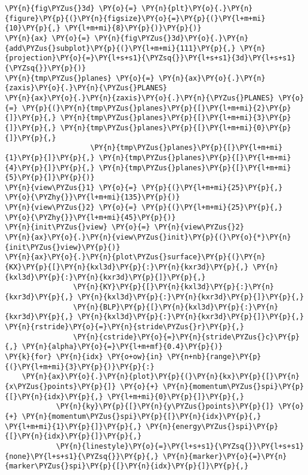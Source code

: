 \begin{Verbatim}[commandchars=\\\{\}]
\PY{n}{fig\PYZus{}3d} \PY{o}{=} \PY{n}{plt}\PY{o}{.}\PY{n}{figure}\PY{p}{(}\PY{n}{figsize}\PY{o}{=}\PY{p}{(}\PY{l+m+mi}{10}\PY{p}{,} \PY{l+m+mi}{8}\PY{p}{)}\PY{p}{)}
\PY{n}{ax} \PY{o}{=} \PY{n}{fig\PYZus{}3d}\PY{o}{.}\PY{n}{add\PYZus{}subplot}\PY{p}{(}\PY{l+m+mi}{111}\PY{p}{,} \PY{n}{projection}\PY{o}{=}\PY{l+s+s1}{\PYZsq{}}\PY{l+s+s1}{3d}\PY{l+s+s1}{\PYZsq{}}\PY{p}{)}
\PY{n}{tmp\PYZus{}planes} \PY{o}{=} \PY{n}{ax}\PY{o}{.}\PY{n}{zaxis}\PY{o}{.}\PY{n}{\PYZus{}PLANES}
\PY{n}{ax}\PY{o}{.}\PY{n}{zaxis}\PY{o}{.}\PY{n}{\PYZus{}PLANES} \PY{o}{=} \PY{p}{(}\PY{n}{tmp\PYZus{}planes}\PY{p}{[}\PY{l+m+mi}{2}\PY{p}{]}\PY{p}{,} \PY{n}{tmp\PYZus{}planes}\PY{p}{[}\PY{l+m+mi}{3}\PY{p}{]}\PY{p}{,} \PY{n}{tmp\PYZus{}planes}\PY{p}{[}\PY{l+m+mi}{0}\PY{p}{]}\PY{p}{,}
                    \PY{n}{tmp\PYZus{}planes}\PY{p}{[}\PY{l+m+mi}{1}\PY{p}{]}\PY{p}{,} \PY{n}{tmp\PYZus{}planes}\PY{p}{[}\PY{l+m+mi}{4}\PY{p}{]}\PY{p}{,} \PY{n}{tmp\PYZus{}planes}\PY{p}{[}\PY{l+m+mi}{5}\PY{p}{]}\PY{p}{)}
\PY{n}{view\PYZus{}1} \PY{o}{=} \PY{p}{(}\PY{l+m+mi}{25}\PY{p}{,} \PY{o}{\PYZhy{}}\PY{l+m+mi}{135}\PY{p}{)}
\PY{n}{view\PYZus{}2} \PY{o}{=} \PY{p}{(}\PY{l+m+mi}{25}\PY{p}{,} \PY{o}{\PYZhy{}}\PY{l+m+mi}{45}\PY{p}{)}
\PY{n}{init\PYZus{}view} \PY{o}{=} \PY{n}{view\PYZus{}2}
\PY{n}{ax}\PY{o}{.}\PY{n}{view\PYZus{}init}\PY{p}{(}\PY{o}{*}\PY{n}{init\PYZus{}view}\PY{p}{)}
\PY{n}{ax}\PY{o}{.}\PY{n}{plot\PYZus{}surface}\PY{p}{(}\PY{n}{KX}\PY{p}{[}\PY{n}{kxl3d}\PY{p}{:}\PY{n}{kxr3d}\PY{p}{,} \PY{n}{kxl3d}\PY{p}{:}\PY{n}{kxr3d}\PY{p}{]}\PY{p}{,}
                \PY{n}{KY}\PY{p}{[}\PY{n}{kxl3d}\PY{p}{:}\PY{n}{kxr3d}\PY{p}{,} \PY{n}{kxl3d}\PY{p}{:}\PY{n}{kxr3d}\PY{p}{]}\PY{p}{,}
                \PY{n}{BLP}\PY{p}{[}\PY{n}{kxl3d}\PY{p}{:}\PY{n}{kxr3d}\PY{p}{,} \PY{n}{kxl3d}\PY{p}{:}\PY{n}{kxr3d}\PY{p}{]}\PY{p}{,} \PY{n}{rstride}\PY{o}{=}\PY{n}{stride\PYZus{}r}\PY{p}{,}
                \PY{n}{cstride}\PY{o}{=}\PY{n}{stride\PYZus{}c}\PY{p}{,} \PY{n}{alpha}\PY{o}{=}\PY{l+m+mf}{0.4}\PY{p}{)}
\PY{k}{for} \PY{n}{idx} \PY{o+ow}{in} \PY{n+nb}{range}\PY{p}{(}\PY{l+m+mi}{3}\PY{p}{)}\PY{p}{:}
    \PY{n}{ax}\PY{o}{.}\PY{n}{plot}\PY{p}{(}\PY{n}{kx}\PY{p}{[}\PY{n}{x\PYZus{}points}\PY{p}{]} \PY{o}{+} \PY{n}{momentum\PYZus{}spi}\PY{p}{[}\PY{n}{idx}\PY{p}{,} \PY{l+m+mi}{0}\PY{p}{]}\PY{p}{,}
            \PY{n}{ky}\PY{p}{[}\PY{n}{y\PYZus{}points}\PY{p}{]} \PY{o}{+} \PY{n}{momentum\PYZus{}spi}\PY{p}{[}\PY{n}{idx}\PY{p}{,} \PY{l+m+mi}{1}\PY{p}{]}\PY{p}{,} \PY{n}{energy\PYZus{}spi}\PY{p}{[}\PY{n}{idx}\PY{p}{]}\PY{p}{,}
            \PY{n}{linestyle}\PY{o}{=}\PY{l+s+s1}{\PYZsq{}}\PY{l+s+s1}{none}\PY{l+s+s1}{\PYZsq{}}\PY{p}{,} \PY{n}{marker}\PY{o}{=}\PY{n}{marker\PYZus{}spi}\PY{p}{[}\PY{n}{idx}\PY{p}{]}\PY{p}{,}

\end{Verbatim}
